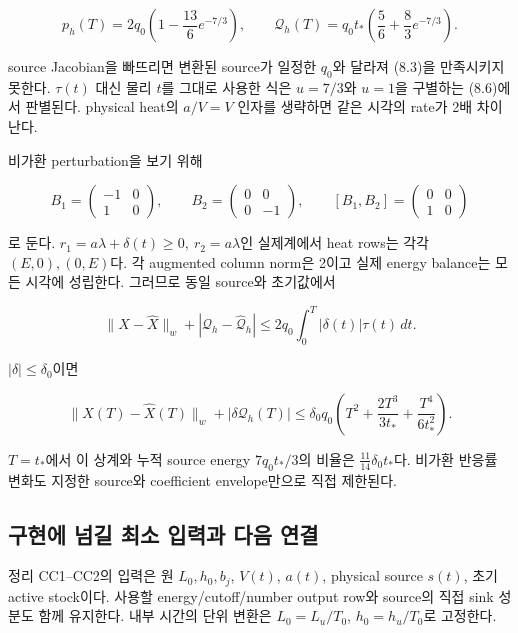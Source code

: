 \documentclass[11pt,a4paper]{article}
\begin{document}
\[
p_h(T)=2q_0\left(1-\frac{13}6e^{-7/3}\right),\qquad
\mathcal Q_h(T)=q_0t_*\left(\frac56+\frac83e^{-7/3}\right).
\tag{8.6}
\]

source Jacobian을 빠뜨리면 변환된 source가 일정한 \(q_0\)와 달라져 (8.3)을 만족시키지 못한다. \(\tau(t)\) 대신 물리 \(t\)를 그대로 사용한 식은 \(u=7/3\)와 \(u=1\)을 구별하는 (8.6)에서 판별된다. physical heat의 \(a/V=V\) 인자를 생략하면 같은 시각의 rate가 2배 차이난다.

비가환 perturbation을 보기 위해

\[
B_1=\begin{pmatrix}-1&0\\1&0\end{pmatrix},
\qquad
B_2=\begin{pmatrix}0&0\\0&-1\end{pmatrix},
\qquad
[B_1,B_2]=\begin{pmatrix}0&0\\1&0\end{pmatrix}
\tag{8.7}
\]

로 둔다. \(r_1=a\lambda+\delta(t)\ge0,\ r_2=a\lambda\)인 실제계에서 heat rows는 각각 \((E,0),(0,E)\)다. 각 augmented column norm은 2이고 실제 energy balance는 모든 시각에 성립한다. 그러므로 동일 source와 초기값에서

\[
\|X-\widehat X\|_w+
|\mathcal Q_h-\widehat{\mathcal Q}_h|
\le2q_0\int_0^T|\delta(t)|\tau(t)\,dt.
\tag{8.8}
\]

\(|\delta|\le\delta_0\)이면

\[
\boxed{
\|X(T)-\widehat X(T)\|_w+
|\delta\mathcal Q_h(T)|
\le\delta_0q_0
\left(T^2+\frac{2T^3}{3t_*}+\frac{T^4}{6t_*^2}\right).
}
\tag{8.9}
\]

\(T=t_*\)에서 이 상계와 누적 source energy \(7q_0t_*/3\)의 비율은 \(\frac{11}{14}\delta_0t_*\)다. 비가환 반응률 변화도 지정한 source와 coefficient envelope만으로 직접 제한된다.

\hypertarget{uxad6cuxd604uxc5d0-uxb118uxae38-uxcd5cuxc18c-uxc785uxb825uxacfc-uxb2e4uxc74c-uxc5f0uxacb0}{%
\subsection{구현에 넘길 최소 입력과 다음 연결}\label{uxad6cuxd604uxc5d0-uxb118uxae38-uxcd5cuxc18c-uxc785uxb825uxacfc-uxb2e4uxc74c-uxc5f0uxacb0}}

정리 CC1--CC2의 입력은 원 \(L_0,h_0,b_j\), \(V(t)\), \(a(t)\), physical source \(s(t)\), 초기 active stock이다. 사용할 energy/cutoff/number output row와 source의 직접 sink 성분도 함께 유지한다. 내부 시간의 단위 변환은 \(L_0=L_u/T_0\), \(h_0=h_u/T_0\)로 고정한다.
\end{document}
